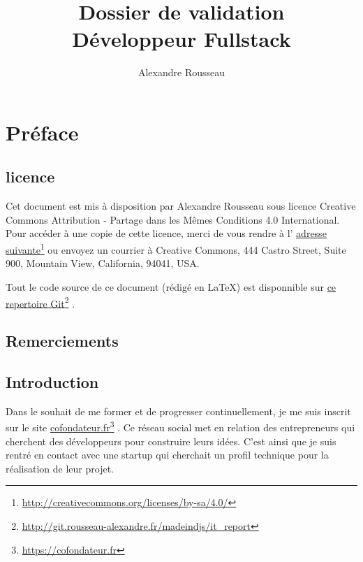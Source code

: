 \documentclass[]{report}
\title{\textbf{Dossier de validation}\\Développeur Fullstack}
\author{Alexandre Rousseau}
\newcommand\fnurl[2]{%
  \href{#1}{#2}\footnote{\url{#1}}%
}
\begin{document}
\lstset{
  autogobble,%
  breaklines=true, %
  captionpos=b, %
  frame=single, %
  showtabs=false, %
  tabsize=2, %
}

\maketitle

\newpage

\tableofcontents
\newpage


\chapter{Préface}

  \section{licence}

    Cet document est mis à disposition par Alexandre Rousseau sous licence Creative Commons Attribution -  Partage dans les Mêmes Conditions 4.0 International. Pour accéder à une copie de cette licence, merci de vous rendre à l'\fnurl{http://creativecommons.org/licenses/by-sa/4.0/}{adresse suivante} ou envoyez un courrier à Creative Commons, 444 Castro Street, Suite 900, Mountain View, California, 94041, USA.

    Tout le code source de ce document (rédigé en \LaTeX) est disponnible sur \fnurl{http://git.rousseau-alexandre.fr/madeindjs/it_report}{ce repertoire Git}.

  \section{Remerciements}


  \section{Introduction}\label{sec:introduction}

    Dans le souhait de me former et de progresser continuellement, je me suis inscrit sur le site  \fnurl{https://cofondateur.fr}{cofondateur.fr}. Ce réseau social met en relation des entrepreneurs qui cherchent des développeurs pour construire leurs idées. C'est ainsi que je suis rentré en contact avec une startup qui cherchait un profil technique pour la réalisation de leur projet.
\end{document}
